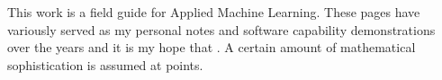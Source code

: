 This work is a field guide for Applied Machine Learning. These pages have variously served as my personal notes and software capability demonstrations over the years and it is my hope that .  A certain amount of mathematical sophistication is assumed at points.

\smallskip
